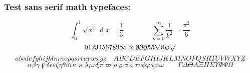 \documentclass[aspectratio=169]{beamer}
\DeclareMathOperator{\diffd}{d}
\begin{document}
\begin{frame}
  \frametitle{Test sans serif math typefaces: \TypefaceName}
  \[
    \int_{0}^{1} \sqrt{x^{4}}\,\diffd x = \frac{1}{3} \qquad\qquad
    \sum_{k=0}^{\infty} \frac{1}{k^{2}} = \frac{\pi^{2}}{6}
  \]
  \[
    0123456789 \infty\propto\emptyset\partial\eth\hbar\hslash\nabla\aleph\mho\surd
  \]
  \[
    abcdefghijklmnopqsrtuvwxyz \quad     ABCDEFGHIJKLMNOPQSRTUVWXYZ
  \]
  \[
    \alpha\beta\gamma\digamma\delta\epsilon\varepsilon\zeta\eta\theta\vartheta\iota\kappa\varkappa\lambda\mu\nu\xi\pi\varpi\rho\varrho\sigma\varsigma\tau\upsilon\phi\varphi\chi\psi\omega \qquad \Gamma\Delta\Theta\Lambda\Xi\Pi\Sigma\Upsilon\Phi\Psi\Omega
  \]
\end{frame}
\end{document}
